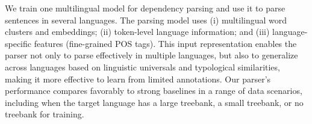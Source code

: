 We train one multilingual model for dependency parsing and use it to parse sentences in several languages. The parsing model uses (i) multilingual word clusters and embeddings; (ii) token-level language information; and (iii) language-specific features (fine-grained POS tags). This input representation enables the parser not only to parse effectively in multiple languages, but also to generalize across languages based on linguistic universals and typological similarities, making it more effective to learn from limited annotations. Our parser's performance compares favorably to strong baselines in a range of data scenarios, including when the target language has a large treebank, a small treebank, or no treebank for training.
